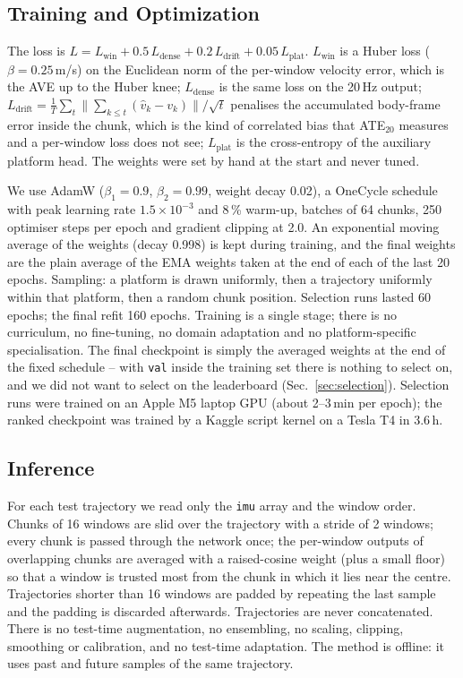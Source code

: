 \documentclass[letterpaper,10pt,conference]{ieeeconf}
\begin{document}
\subsection{Training and Optimization}
The loss is
$L = L_{\mathrm{win}} + 0.5\,L_{\mathrm{dense}} + 0.2\,L_{\mathrm{drift}} + 0.05\,L_{\mathrm{plat}}$.
$L_{\mathrm{win}}$ is a Huber loss ($\beta = 0.25$\,m/s) on the Euclidean norm of the per-window velocity error,
which is the AVE up to the Huber knee; $L_{\mathrm{dense}}$ is the same loss on the 20\,Hz output;
$L_{\mathrm{drift}} = \frac{1}{T}\sum_{t}\lVert\sum_{k\le t}(\hat v_k - v_k)\rVert / \sqrt{t}$ penalises the
accumulated body-frame error inside the chunk, which is the kind of correlated bias that ATE$_{20}$ measures and a
per-window loss does not see; $L_{\mathrm{plat}}$ is the cross-entropy of the auxiliary platform head. The weights
were set by hand at the start and never tuned.

We use AdamW ($\beta_1{=}0.9$, $\beta_2{=}0.99$, weight decay 0.02), a OneCycle schedule with peak learning rate
$1.5\times10^{-3}$ and 8\,\% warm-up, batches of 64 chunks, 250 optimiser steps per epoch and gradient clipping at
2.0. An exponential moving average of the weights (decay 0.998) is kept during training, and the final weights are
the plain average of the EMA weights taken at the end of each of the last 20 epochs. Sampling: a platform is drawn
uniformly, then a trajectory uniformly within that platform, then a random chunk position. Selection runs lasted 60
epochs; the final refit 160 epochs. Training is a single stage; there is no curriculum, no fine-tuning, no domain
adaptation and no platform-specific specialisation. The final checkpoint is simply the averaged weights at the end
of the fixed schedule -- with \texttt{val} inside the training set there is nothing to select on, and we did not
want to select on the leaderboard (Sec.~\ref{sec:selection}). Selection runs were trained on an Apple M5 laptop GPU
(about 2--3\,min per epoch); the ranked checkpoint was trained by a Kaggle script kernel on a Tesla T4 in 3.6\,h.

\subsection{Inference}
For each test trajectory we read only the \texttt{imu} array and the window order. Chunks of 16 windows are slid
over the trajectory with a stride of 2 windows; every chunk is passed through the network once; the per-window
outputs of overlapping chunks are averaged with a raised-cosine weight (plus a small floor) so that a window is
trusted most from the chunk in which it lies near the centre. Trajectories shorter than 16 windows are padded by
repeating the last sample and the padding is discarded afterwards. Trajectories are never concatenated. There is no
test-time augmentation, no ensembling, no scaling, clipping, smoothing or calibration, and no test-time adaptation.
The method is offline: it uses past and future samples of the same trajectory.
\end{document}
